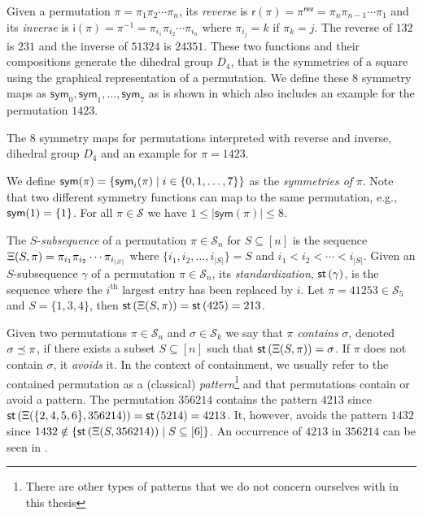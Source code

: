 Given a permutation $\pi = \pi_1\pi_2\dotsm\pi_n$, its \emph{reverse} is $\textsf{r}(\pi) = \pi^\textsf{rev} = \pi_n\pi_{n-1}\dotsm\pi_1$ and its \emph{inverse} is $\textsf{i}(\pi) = \pi^{-1} = \pi_{i_1}\pi_{i_2}\dotsm\pi_{i_n}$ where $\pi_{i_j} = k$ if $\pi_k = j$. The reverse of $132$ is $231$ and the inverse of $51324$ is $24351$. These two functions and their compositions generate the dihedral group $D_4$, that is the symmetries of a square using the graphical representation of a permutation. We define these 8 symmetry maps as $\textsf{sym}_0,\textsf{sym}_1,\dotsc,\textsf{sym}_7$ as is shown in  which also includes an example for the permutation $1423$.

\begin{table}[ht!]
    \centering
    
    \caption{The 8 symmetry maps for permutations interpreted with reverse and inverse, dihedral group $D_4$ and an example for $\pi=1423$.}
    \label{tab:permsym}
\end{table}

We define $\textsf{sym}(\pi) = \left\{\textsf{sym}_i(\pi) \mid i \in \left\{0,1,\dotsc,7\right\}\right\}$ as the \emph{symmetries of} $\pi$. Note that two different symmetry functions can map to the same permutation, e.g., $\textsf{sym}(1) = \left\{1\right\}$. For all $\pi \in \mathcal{S}$ we have $1 \leq |\textsf{sym}(\pi)| \leq 8$.


The $S$-\emph{subsequence} of a permutation $\pi \in \mathcal{S}_n$ for $S\subseteq [n]$ is the sequence $\Xi(S,\pi)=\pi_{i_1}\pi_{i_2}\dotsb \pi_{i_{|S|}}$ where $\{i_1,i_2,\dotsc,i_{|S|}\} = S$ and $i_1 < i_2 < \dotsb < i_{|S|}$. Given an $S$-subsequence $\gamma$ of a permutation $\pi \in \mathcal{S}_n$, its \emph{standardization}, $\textsf{st}\left(\gamma\right)$, is the sequence where the $i^\text{th}$ largest entry has been replaced by $i$. Let $\pi = 41253 \in \mathcal{S}_5$ and $S=\{1,3,4\}$, then $\textsf{st}\left(\Xi(S,\pi)\right) = \textsf{st}\left(425\right) = 213$.

Given two permutations $\pi \in \mathcal{S}_n$ and $\sigma \in \mathcal{S}_k$ we say that $\pi$ \emph{contains} $\sigma$, denoted $\sigma \preceq \pi$, if there exists a subset $S \subseteq [n]$ such that $\textsf{st}\left(\Xi(S,\pi)\right) = \sigma$. If $\pi$ does not contain $\sigma$, it \emph{avoids} it. In the context of containment, we usually refer to the contained permutation as a (classical) \emph{pattern}\footnote{There are other types of patterns that we do not concern ourselves with in this thesis} and that permutations contain or avoid a pattern. The permutation $356214$ contains the pattern $4213$ since $\textsf{st}\left(\Xi(\{2, 4, 5, 6\},356214)\right) = \textsf{st}\left(5214\right) = 4213$. It, however, avoids the pattern $1432$ since $1432 \notin \left\{\textsf{st}\left(\Xi(S,356214)\right) \mid S \subseteq [6]\right\}$. An occurrence of $4213$ in $356214$ can be seen in .

